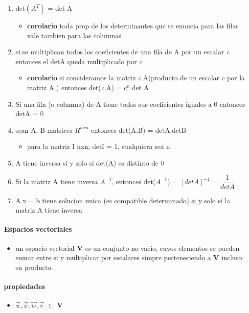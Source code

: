 \documentclass[a4paper]{article}
\begin{document}
\begin{enumerate}
	\item det$(A^T)$ = det A
	\begin{itemize}
		\item \textbf{corolario} toda prop de los determinantes que se enuncia para las filas vale tambien para las columnas
	\end{itemize}
	\item si se multiplican todos los coeficientes de una fila de A por un escalar \textit{c} entonces el detA queda multiplicado por \textit{c}
	\begin{itemize}
		\item \textbf{corolario} si concideramos la matriz \textit{c}.A(producto de un escalar \textit{c} por la matriz A ) entonces det(\textit{c}.A) = $c^n$.det A
	\end{itemize}
	\item Si una fila (o columna) de A tiene todos sus coeficientes iguales a 0 entonces detA = 0
	\item sean A, B matrices $R^{nxn}$ entonces det(A.B) = detA.detB
	\begin{itemize}
		\item para la matriz I nxn, detI = 1, cualquiera sea n
	\end{itemize}
	\item A tiene inversa si y solo si det(A) es distinto de 0
	\item Si la matriz A tiene inversa $A^{-1}$, entonces det($A^{-1}$) = $[det A]^{-1}$ = $\dfrac{1}{det A}$
	\item A.x = b tiene solucion unica (es compatible determinado) si y solo si la matriz A tiene inversa
\end{enumerate}

\paragraph{Espacios vectoriales}
\begin{itemize}
	\item un espacio vectorial $\textbf{V}$ es un conjunto no vacio, cuyos elementos se pueden sumar entre si y multiplicar por escalares simpre perteneciendo a $\textbf{V}$ incluso su producto.
\end{itemize}
\paragraph{propiedades}
\begin{itemize}
	\item $\vec{u},\vec{x},\vec{w},\vec{v}$ $\in$ $\textbf{V}$
\end{itemize}
\end{document}
